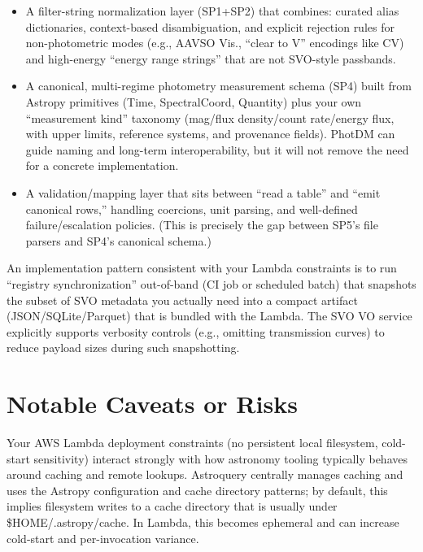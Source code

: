 \documentclass[twocolumn]{aastex701}
\begin{document}
\begin{itemize}
\item A filter-string normalization layer (SP1+SP2) that combines: curated alias dictionaries, context-based disambiguation, and explicit rejection rules for non-photometric modes (e.g., AAVSO Vis., “clear to V” encodings like CV) and high-energy “energy range strings” that are not SVO-style passbands. \citep{ref40}

\item A canonical, multi-regime photometry measurement schema (SP4) built from Astropy primitives (Time, SpectralCoord, Quantity) plus your own “measurement kind” taxonomy (mag/flux density/count rate/energy flux, with upper limits, reference systems, and provenance fields). PhotDM can guide naming and long-term interoperability, but it will not remove the need for a concrete implementation. \citep{ref41}

\item A validation/mapping layer that sits between “read a table” and “emit canonical rows,” handling coercions, unit parsing, and well-defined failure/escalation policies. (This is precisely the gap between SP5’s file parsers and SP4’s canonical schema.) \citep{ref42}
\end{itemize}

An implementation pattern consistent with your Lambda constraints is to run “registry synchronization” out-of-band (CI job or scheduled batch) that snapshots the subset of SVO metadata you actually need into a compact artifact (JSON/SQLite/Parquet) that is bundled with the Lambda. The SVO VO service explicitly supports verbosity controls (e.g., omitting transmission curves) to reduce payload sizes during such snapshotting. \citep{ref43}

\section{Notable Caveats or Risks}

Your AWS Lambda deployment constraints (no persistent local filesystem, cold-start sensitivity) interact strongly with how astronomy tooling typically behaves around caching and remote lookups. Astroquery centrally manages caching and uses the Astropy configuration and cache directory patterns; by default, this implies filesystem writes to a cache directory that is usually under \$HOME/.astropy/cache. In Lambda, this becomes ephemeral and can increase cold-start and per-invocation variance. \citep{ref44}
\end{document}
